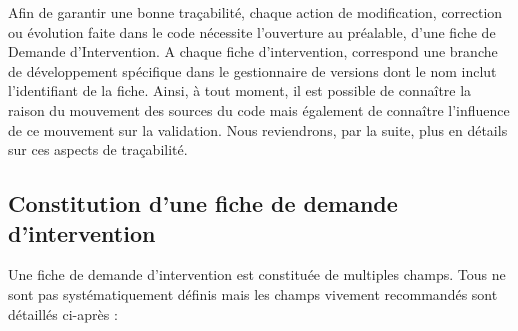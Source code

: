 Afin de garantir une bonne traçabilité, chaque action de modification, correction ou évolution faite dans le code nécessite l'ouverture au préalable, d'une fiche de Demande d'Intervention. A chaque fiche d'intervention, correspond une branche de développement spécifique dans le gestionnaire de versions dont le nom inclut l'identifiant de la fiche. Ainsi, à tout moment, il est possible de connaître la raison du mouvement des sources du code mais également de connaître l'influence de ce mouvement sur la validation. Nous reviendrons, par la suite, plus en détails sur ces aspects de traçabilité.\\

\subsection{\label{subsec: ficheDI}Constitution d'une fiche de demande d'intervention}
Une fiche de demande d'intervention est constituée de multiples champs. Tous ne sont pas syst\'ematiquement d\'efinis mais les champs vivement recommandés sont détaillés ci-après :\\
